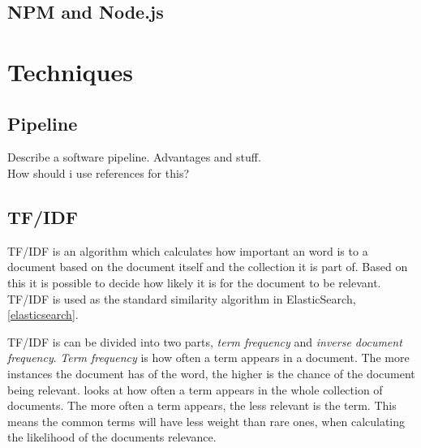 \subsection{NPM and Node.js}

\section{Techniques}

\subsection{Pipeline} \label{pipeline}
Describe a software pipeline. Advantages and stuff.\\
How should i use references for this?

\subsection{TF/IDF} \label{tf/idf}
TF/IDF is an algorithm which calculates how important an word is to a document based on the document itself and the collection it is part of. Based on this it is possible to decide how likely it is for the document to be relevant. TF/IDF is used as the standard similarity algorithm in ElasticSearch, \ref{elasticsearch}.

TF/IDF is can be divided into two parts, \textit{term frequency} and \textit{inverse document frequency}. \textit{Term frequency} is how often a term appears in a document. The more instances the document has of the word, the higher is the chance of the document being relevant.  looks at how often a term appears in the whole collection of documents. The more often a term appears, the less relevant is the term. This means the common terms will have less weight than rare ones, when calculating the likelihood of the documents relevance. 

\cleardoublepage
